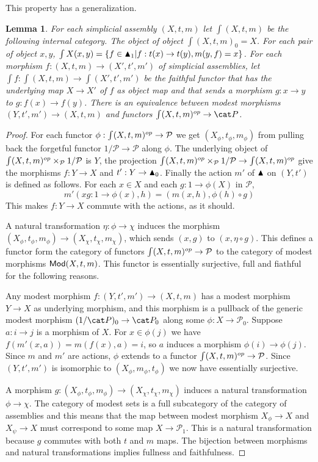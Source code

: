 \documentclass{amsart}
\theoremstyle{plain}
\newtheorem{lemma}[theorem]{Lemma}
\theoremstyle{definition}
\newcommand\cat\mathcal
\newcommand\set[1]{\left\{#1\right\}}
\begin{document}
This property has a generalization.

\newcommand\elt{\int}
\begin{lemma} For each simplicial assembly $(X,t,m)$ let $\elt (X,t,m)$ be the following internal category. The object of object $\elt(X,t,m)_0 = X$. For each pair of object $x,y$, $\elt X(x,y) = \set{ f\in \simpcat_1| f:t(x)\to t(y), m(y,f) = x}$. For each morphism $f:(X,t,m)\to(X',t',m')$ of simplicial assemblies, let $\elt f:\elt(X,t,m)\to \elt(X',t',m')$ be the faithful functor that has the underlying map $X\to X'$ of $f$ as object map and that sends a morphism $g:x\to y$ to $g:f(x)\to f(y)$. There is an equivalence between modest morphisms $(Y,t',m') \to (X,t,m)$ and functors $\elt(X,t,m)\dual \to \pers$. \end{lemma}

\begin{proof} For each functor $\phi:\elt(X,t,m)\dual \to \cat P$ we get $(X_\phi,t_\phi,m_\phi)$ from pulling back the forgetful functor $1/\cat P \to \cat P$ along $\phi$. The underlying object of $\elt(X,t,m)\dual\times_{\cat P} 1/\cat P$ is $Y$, the projection $\elt(X,t,m)\dual\times_{\cat P} 1/\cat P \to \elt(X,t,m)\dual$ give the morphisms $f:Y\to X$ and $t':Y\to \blacktriangle_0$. Finally the action $m'$ of $\blacktriangle$ on $(Y,t')$ is defined as follows. For each $x\in X$ and each $g:1\to \phi(X)$ in $\cat P$,
\[ m'( x g:1\to \phi(x) ,h) = (m(x,h),\phi(h)\circ g) \]
This makes $f:Y\to X$ commute with the actions, as it should.

A natural transformation $\eta:\phi \to \chi$ induces the morphism $(X_\phi,t_\phi,m_\phi) \to (X_\chi,t_\chi,m_\chi)$, which sends $(x,g)$ to $(x,\eta\circ g)$. This defines a functor form the category of functors $\elt(X,t,m)\dual\to\cat P$ to the category of modest morphisms $\mathsf{Mod}(X,t,m)$. This functor is essentially surjective, full and fiathful for the following reasons.

Any modest morphism $f:(Y,t',m') \to (X,t,m)$ has a modest morphism $Y\to X$ as underlying morphism, and this morphism is a pullback of the generic modest morphism $(1/\pers)_0 \to \pers_0$ along some $\phi: X\to \cat P_0$. Suppose $a:i\to j$ is a morphism of $X$. For $x\in \phi(j)$ we have $f(m'(x,a)) = m(f(x),a) = i$, so $a$ induces a morphism $\phi(i)\to \phi(j)$. Since $m$ and $m'$ are actions, $\phi$ extends to a functor $\elt(X,t,m)\dual \to \cat P$. Since $(Y,t', m')$ is isomorphic to $(X_\phi,m_\phi,t_\phi)$ we now have essentially surjective. %

A morphism $g:(X_\phi,t_\phi,m_\phi) \to (X_\chi,t_\chi,m_\chi)$ induces a natural transformation $\phi \to \chi$. The category of modest sets is a full subcategory of the category of assemblies and this means that the map between modest morphism $X_\phi \to X$ and $X_\psi\to X$ must correspond to some map $X\to\cat P_1$. This is a natural transformation because $g$ commutes with both $t$ and $m$ maps. The bijection between morphisms and natural transformations implies fullness and faithfulness.
\end{proof}
\end{document}
